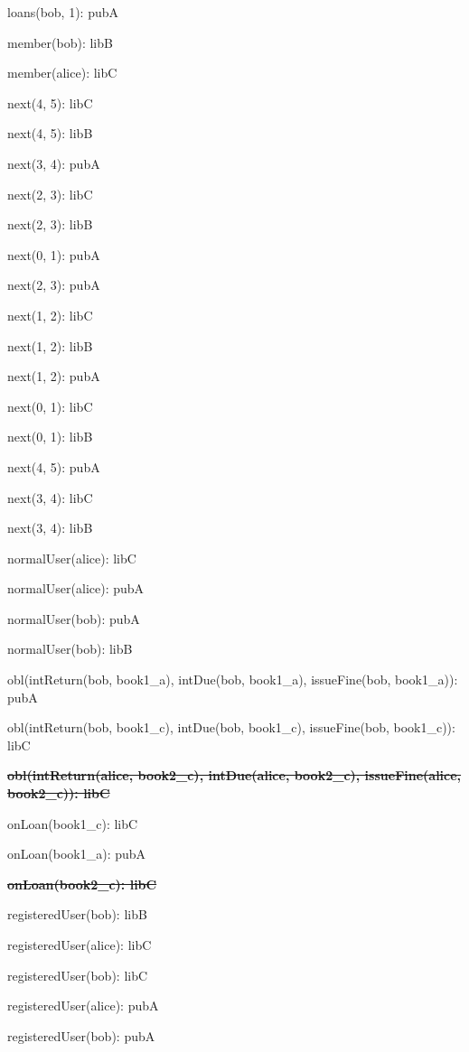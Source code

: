 \documentclass{article}
\newenvironment{states}
        {\begin{minipage}{\tableWidth}\raggedright\begin{description}[align=left,leftmargin=1em,noitemsep,labelsep=\parindent]}
        {\end{description}\end{minipage}}
\begin{document}
{\begin{states}
\item{{loans(\allowbreak{}bob, 1): pubA}}
\item{{member(\allowbreak{}bob): libB}}
\item{{member(\allowbreak{}alice): libC}}
\item{{next(\allowbreak{}4, 5): libC}}
\item{{next(\allowbreak{}4, 5): libB}}
\item{{next(\allowbreak{}3, 4): pubA}}
\item{{next(\allowbreak{}2, 3): libC}}
\item{{next(\allowbreak{}2, 3): libB}}
\item{{next(\allowbreak{}0, 1): pubA}}
\item{{next(\allowbreak{}2, 3): pubA}}
\item{{next(\allowbreak{}1, 2): libC}}
\item{{next(\allowbreak{}1, 2): libB}}
\item{{next(\allowbreak{}1, 2): pubA}}
\item{{next(\allowbreak{}0, 1): libC}}
\item{{next(\allowbreak{}0, 1): libB}}
\item{{next(\allowbreak{}4, 5): pubA}}
\item{{next(\allowbreak{}3, 4): libC}}
\item{{next(\allowbreak{}3, 4): libB}}
\item{{normalUser(\allowbreak{}alice): libC}}
\item{{normalUser(\allowbreak{}alice): pubA}}
\item{{normalUser(\allowbreak{}bob): pubA}}
\item{{normalUser(\allowbreak{}bob): libB}}
\item{{obl(\allowbreak{}intReturn(\allowbreak{}bob, book1\_a), intDue(\allowbreak{}bob, book1\_a), issueFine(\allowbreak{}bob, book1\_a)): pubA}}
\item{{obl(\allowbreak{}intReturn(\allowbreak{}bob, book1\_c), intDue(\allowbreak{}bob, book1\_c), issueFine(\allowbreak{}bob, book1\_c)): libC}}
\item\textbf{\sout{obl(\allowbreak{}intReturn(\allowbreak{}alice, book2\_c), intDue(\allowbreak{}alice, book2\_c), issueFine(\allowbreak{}alice, book2\_c)): libC}}
\item{{onLoan(\allowbreak{}book1\_c): libC}}
\item{{onLoan(\allowbreak{}book1\_a): pubA}}
\item\textbf{\sout{onLoan(\allowbreak{}book2\_c): libC}}
\item{{registeredUser(\allowbreak{}bob): libB}}
\item{{registeredUser(\allowbreak{}alice): libC}}
\item{{registeredUser(\allowbreak{}bob): libC}}
\item{{registeredUser(\allowbreak{}alice): pubA}}
\item{{registeredUser(\allowbreak{}bob): pubA}}
\end{states}}
\end{document}
